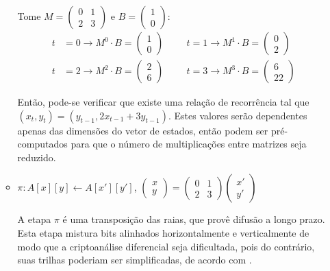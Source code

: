\documentclass{article}
\begin{document}
\begin{enumerate}[label=(\alph*)]
\begin{itemize}
Tome $M = \begin{pmatrix} 0 & 1 \\ 2 & 3 \end{pmatrix}$ e
$B = \begin{pmatrix} 1 \\ 0 \end{pmatrix}$:
\begin{align*}
t &= 0 \longrightarrow M^{0} \cdot B
    = \begin{pmatrix} 1 \\ 0 \end{pmatrix} \hspace{1cm}
t = 1 \longrightarrow M^{1} \cdot B
    = \begin{pmatrix} 0 \\ 2 \end{pmatrix} \\
t &= 2 \longrightarrow M^{2} \cdot B
    = \begin{pmatrix} 2 \\ 6 \end{pmatrix} \hspace{1cm}
t = 3 \longrightarrow M^{3} \cdot B
    = \begin{pmatrix} 6 \\ 22 \end{pmatrix}
\end{align*}

Então, pode-se verificar que existe uma relação de recorrência tal que
$(x_{t}, y_{t}) = (y_{t-1}, 2x_{t-1} + 3y_{t-1})$. Estes valores serão
dependentes apenas das dimensões do vetor de estados, então podem ser
pré-computados para que o número de multiplicações entre matrizes seja
reduzido.

\item $\pi : A[x][y] \longleftarrow A[x'][y']$,
    $\begin{pmatrix} x \\ y \end{pmatrix}
    = \begin{pmatrix} 0 & 1 \\ 2 & 3 \end{pmatrix}
    \begin{pmatrix} x' \\ y' \end{pmatrix}$

A etapa $\pi$ é uma transposição das raias, que provê difusão a longo prazo.
Esta etapa mistura bits alinhados horizontalmente e verticalmente de modo que
a criptoanálise diferencial seja dificultada, pois do contrário, suas trilhas
poderiam ser simplificadas, de acordo com \cite{KeccakDC}.


\end{itemize}
\end{enumerate}
\end{document}
